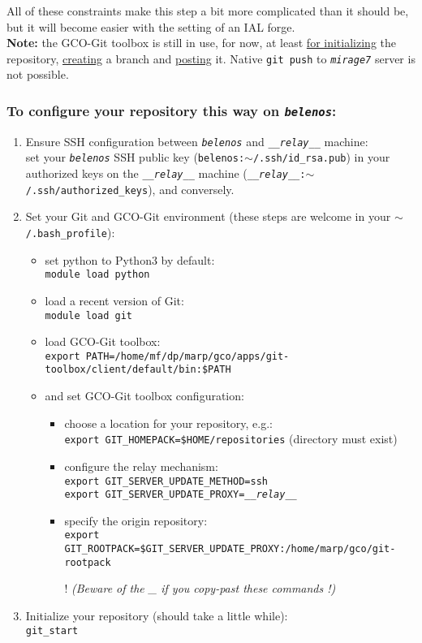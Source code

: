 \documentclass[a4paper,10pt,twoside]{article}
\begin{document}
All of these constraints make this step a bit more complicated than it should be, but it will become easier with the setting of an IAL forge.\\

\noindent \textbf{Note:} the GCO-Git toolbox is still in use, for now, at least \underline{for initializing} the repository, \underline{creating} a branch and \underline{posting} it. Native \texttt{git push} to \texttt{\textit{mirage7}} server is not possible.

\subsubsection*{To configure your repository this way on \texttt{\textit{belenos}}:}
\begin{enumerate}[label=(IAL.\arabic*)]
 \item Ensure SSH configuration between \textit{\texttt{belenos}} and \textit{\texttt{\_\_relay\_\_}} machine:\\
 set your \textit{\texttt{belenos}} SSH public key (\texttt{belenos:$\sim$/.ssh/id\_rsa.pub}) in your authorized keys on the \textit{\texttt{\_\_relay\_\_}} machine (\texttt{\textit{\_\_relay\_\_}:$\sim$/.ssh/authorized\_keys}), and conversely.
 \item Set your Git and GCO-Git environment (these steps are welcome in your \texttt{$\sim$/.bash\_profile}):
 \begin{itemize}
  \item set python to Python3 by default:\\
  \texttt{module load python}
  \item load a recent version of Git:\\
  \texttt{module load git}
  \item load GCO-Git toolbox:\\
  \texttt{export PATH=/home/mf/dp/marp/gco/apps/git-toolbox/client/default/bin:\$PATH}
  \item and set GCO-Git toolbox configuration:
  \begin{itemize}
   \item choose a location for your repository, e.g.:\\
   \texttt{export GIT\_HOMEPACK=\$HOME/repositories} (directory must exist)
   \item configure the relay mechanism:\\
   \texttt{export GIT\_SERVER\_UPDATE\_METHOD=ssh}\\
   \texttt{export GIT\_SERVER\_UPDATE\_PROXY=\textit{\_\_relay\_\_}}
   \item specify the origin repository:\\
   \texttt{export GIT\_ROOTPACK=\$GIT\_SERVER\_UPDATE\_PROXY:/home/marp/gco/git-rootpack}
   \item[!] \textit{(Beware of the \_ if you copy-past these commands !)}
  \end{itemize}
 \end{itemize}
 \item Initialize your repository (should take a little while):\\
 \texttt{git\_start}
\end{enumerate}
\end{document}
